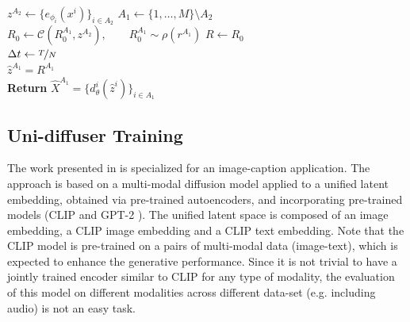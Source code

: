 \begin{algorithm}[hbt!]
\DontPrintSemicolon
\SetAlgoLined
\SetNoFillComment
\LinesNotNumbered 
\caption{MLD conditional generation.}\label{algo:MLD_cond_gen}
$z^{A_2} \gets \{ e_{\phi_i}(x^i) \}_{i \in A_2} $    
$A_1\gets \{1,\dots,M\}\setminus A_2 $  
$R_0 \gets \mathcal{C} ( R_0^{A_1}, z^{A_2}),  \qquad  R_0^{A_1} \sim \rho(r^{A_1}) $   
$R \gets R_0$\\
$\Delta t \gets \nicefrac{T}{N}$ \\
$ \hat{z}^{A_1} = R^{A_1}$ \\
\textbf{Return} $\hat{X}^{A_1} = \{d^i_\theta(\hat{z}^{i} )\}_{i\in A_1}$  
\end{algorithm}

\subsection{Uni-diffuser Training}
The work presented in \cite{bao2023transformer} is specialized for an image-caption application. The approach is based on a multi-modal diffusion model applied to a unified latent embedding, obtained via pre-trained autoencoders, and incorporating pre-trained models (CLIP \cite{radford2021clip} and GPT-2 \cite{radford2019language}). The unified latent space is composed of an image embedding, a CLIP image embedding and a CLIP text embedding. Note that the CLIP model is pre-trained on a pairs of multi-modal data (image-text), which is expected to enhance the generative performance. Since it is not trivial to have a jointly trained encoder similar to CLIP for any type of modality, the evaluation of this model on different modalities across different data-set (e.g. including audio) is not an easy task.

